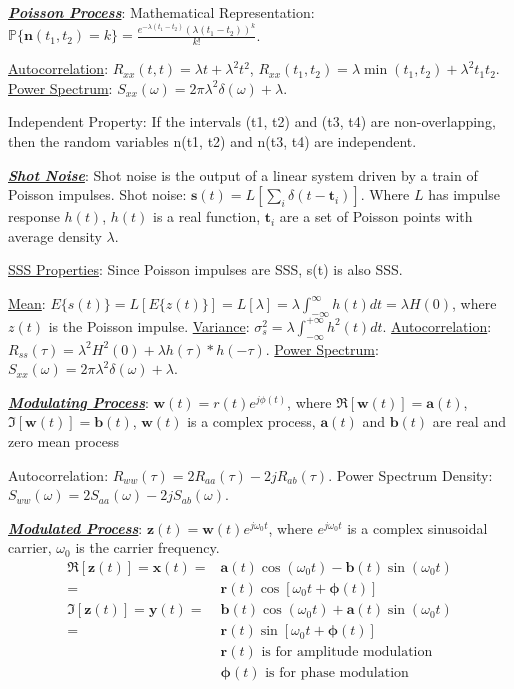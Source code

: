 \documentclass[12pt]{article}
\newcommand{\bulletPoint}[1]{\ul{\textit{\textbf{#1}}}}
\begin{document}
\begin{multicols*}{4}
\bulletPoint{Poisson Process}:
Mathematical Representation: $\mathbb{P}\{ \mathbf{n}(t_1, t_2) = k \} = \frac{e^{-\lambda (t_1-t_2)} (\lambda (t_1-t_2))^k}{k!}$.

\underline{Autocorrelation}: $R_{xx}(t,t) = \lambda t + \lambda^2 t^2$, $R_{xx}(t_1, t_2) = \lambda \min(t_1, t_2)+\lambda^2t_1t_2$. \underline{Power Spectrum}: $S_{xx}(\omega) = 2\pi \lambda^2\delta(\omega) + \lambda$.

Independent Property: If the intervals (t1, t2) and (t3, t4) are non-overlapping, then the random variables n(t1, t2) and n(t3, t4) are independent.


\bulletPoint{Shot Noise}: Shot noise is the output of a linear system driven by a train of Poisson impulses. Shot noise: $\mathbf{s}(t) = L\left[\sum_i \delta(t-\mathbf{t}_i)\right]$. Where $L$ has impulse response $h(t)$, $h(t)$ is a real function, $\mathbf{t}_i$ are a set of Poisson points with average density $\lambda$.

\underline{SSS Properties}: Since Poisson impulses are SSS, s(t) is also SSS.

\underline{Mean}: $E\{s(t)\} = L[E\{z(t)\}] = L[\lambda] = \lambda \int^\infty_{-\infty}h(t)dt = \lambda H(0)$, where $z(t)$ is the Poisson impulse. \underline{Variance}: $\sigma^2_s = \lambda\int^{+\infty}_{-\infty}h^2(t)dt$. \underline{Autocorrelation}: $R_{ss}(\tau) = \lambda^2H^2(0) + \lambda h(\tau) * h(-\tau)$. \underline{Power Spectrum}: $S_{xx}(\omega) = 2\pi \lambda^2\delta(\omega) + \lambda$.


\bulletPoint{Modulating Process}: $\mathbf{w}(t) = r(t)e^{j\phi(t)}$,
where $\Re[\mathbf{w}(t)] = \mathbf{a}(t)$, $\Im[\mathbf{w}(t)] = \mathbf{b}(t)$, $\mathbf{w}(t)$ is a complex process, $\mathbf{a}(t)$ and $\mathbf{b}(t)$ are real and zero mean process

Autocorrelation: $R_{ww}(\tau) = 2R_{aa}(\tau) - 2jR_{ab}(\tau)$. Power Spectrum Density: $S_{ww}(\omega) = 2S_{aa}(\omega) - 2jS_{ab}(\omega)$.


\bulletPoint{Modulated Process}: $\mathbf{z}(t) = \mathbf{w}(t)e^{j\omega_0t}$, where $e^{j\omega_0t}$ is a complex sinusoidal carrier, $\omega_0$ is the carrier frequency.
\useshortskip \begin{equation*}
    \begin{split}
        \Re[\mathbf{z}(t)] = \mathbf{x}(t) = & \mathbf{a}(t)\cos(\omega_0t) - \mathbf{b}(t)\sin(\omega_0t)\\[-3pt]
        =& \mathbf{r}(t)\cos[\omega_0t+\mathbf{\phi}(t)] \\[-3pt]
        \Im[\mathbf{z}(t)] = \mathbf{y}(t) = &  \mathbf{b}(t)\cos(\omega_0t) + \mathbf{a}(t)\sin(\omega_0t)\\[-3pt]
        = &  \mathbf{r}(t)\sin[\omega_0t+\mathbf{\phi}(t)] \\[-3pt]
        & \text{$\mathbf{r}(t)$ is for amplitude modulation}\\[-3pt]
        & \text{$\mathbf{\phi}(t)$ is for phase modulation}\\[-7pt]
    \end{split}
\end{equation*}


\end{multicols*}
\end{document}
